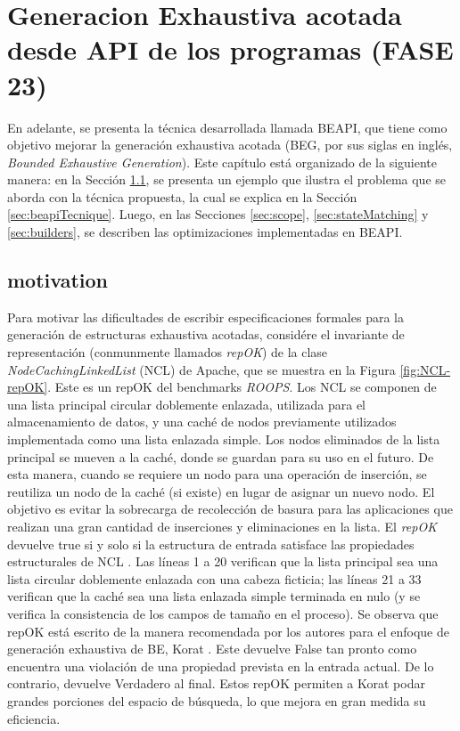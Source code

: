 \chapter{Generacion Exhaustiva acotada desde API de los programas (FASE 23)}


\label{cap:beapi}

En adelante, se presenta la técnica  desarrollada llamada BEAPI, que tiene como objetivo mejorar la generación exhaustiva acotada (BEG, por sus siglas en inglés, \emph{Bounded Exhaustive Generation}). Este capítulo está organizado de la siguiente manera: en la Sección \ref{sec:motivation}, se presenta un ejemplo que ilustra el problema que se aborda con la técnica propuesta, la cual se explica en la Sección \ref{sec:beapiTecnique}. Luego, en las Secciones \ref{sec:scope}, \ref{sec:stateMatching} y \ref{sec:builders}, se describen las optimizaciones implementadas en BEAPI.


\section[Motivation]{motivation}
\label{sec:motivation}

Para motivar las dificultades de escribir especificaciones formales para la generación de estructuras exhaustiva acotadas,  considére el invariante de representación (conmunmente llamados \emph{repOK}) de la clase \emph{NodeCachingLinkedList} (NCL) de Apache, que se muestra en la Figura \ref{fig:NCL-repOK}. Este es un repOK del benchmarks \emph{ROOPS}. Los NCL se componen de una lista principal circular doblemente enlazada, utilizada para el almacenamiento de datos, y una caché de nodos previamente utilizados implementada como una lista enlazada simple. Los nodos eliminados de la lista principal se mueven a la caché, donde se guardan para su uso en el futuro. De esta manera, cuando se requiere un nodo para una operación de inserción, se reutiliza un nodo de la caché (si existe) en lugar de asignar un nuevo nodo. El objetivo es evitar la sobrecarga de recolección de basura para las aplicaciones que realizan una gran cantidad de inserciones y eliminaciones en la lista. El \emph{repOK} devuelve true si y solo si la estructura de entrada satisface las propiedades estructurales de NCL \cite{Liskov00}. Las líneas 1 a 20 verifican que la lista principal sea una lista circular doblemente enlazada con una cabeza ficticia; las líneas 21 a 33 verifican que la caché sea una lista enlazada simple terminada en nulo (y se verifica la consistencia de los campos de tamaño en el proceso). Se observa que repOK está escrito de la manera recomendada por los autores para el enfoque de generación exhaustiva de BE, \textsf{Korat} \cite{Boyapati02}. Este devuelve False tan pronto como encuentra una violación de una propiedad prevista en la entrada actual. De lo contrario, devuelve Verdadero al final. Estos repOK permiten a \textsf{Korat} podar grandes porciones del espacio de búsqueda, lo que mejora en gran medida su eficiencia.


